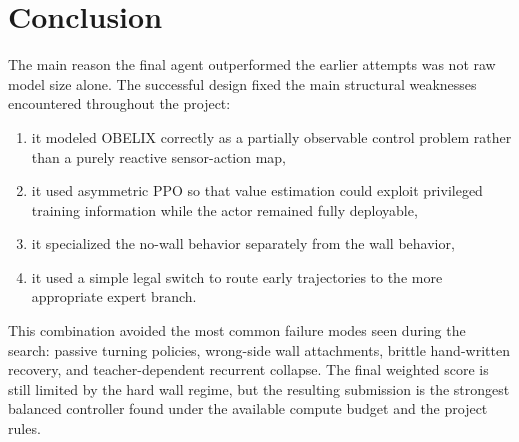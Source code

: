 \documentclass[11pt]{article}
\begin{document}
\section{Conclusion}

The main reason the final agent outperformed the earlier attempts was not raw model
size alone. The successful design fixed the main structural weaknesses encountered
throughout the project:
\begin{enumerate}[leftmargin=1.5em]
  \item it modeled OBELIX correctly as a partially observable control problem rather
  than a purely reactive sensor-action map,
  \item it used asymmetric PPO so that value estimation could exploit privileged training
  information while the actor remained fully deployable,
  \item it specialized the no-wall behavior separately from the wall behavior,
  \item it used a simple legal switch to route early trajectories to the more appropriate
  expert branch.
\end{enumerate}

This combination avoided the most common failure modes seen during the search:
passive turning policies, wrong-side wall attachments, brittle hand-written recovery, and
teacher-dependent recurrent collapse. The final weighted score is still limited by the
hard wall regime, but the resulting submission is the strongest balanced controller found
under the available compute budget and the project rules.
\end{document}
